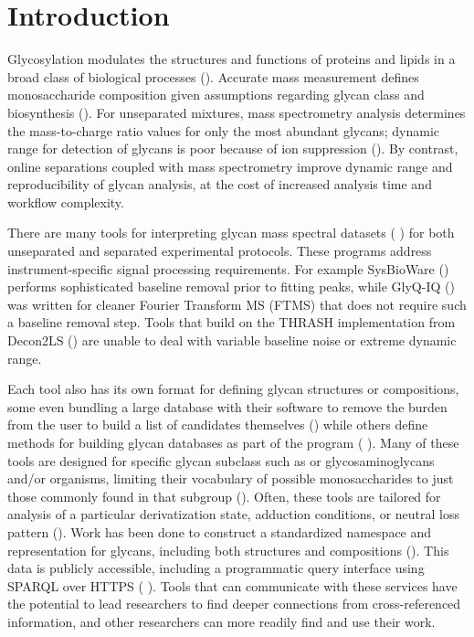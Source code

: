 \section{Introduction}

Glycosylation modulates the structures and functions of proteins and lipids
in a broad class of biological processes (\cite{Varki2017}). Accurate mass
measurement defines monosaccharide composition given assumptions regarding
glycan class and biosynthesis (\cite{Zaia2008}). For unseparated mixtures,
mass spectrometry analysis determines the mass-to-charge ratio values for
only the most abundant glycans; dynamic range for detection of glycans is
poor because of ion suppression (\cite{Peltoniemi2013}). By contrast, online
separations coupled with mass spectrometry improve dynamic range and
reproducibility of glycan analysis, at the cost of increased analysis time
and workflow complexity. 

There are many tools for interpreting glycan mass spectral datasets (
\cite{Yu2013,Peltoniemi2013,Kronewitter2014,Goldberg2009,Maxwell2012,Ceroni2008,Frank2010})
for both unseparated and separated experimental protocols. These programs address
instrument-specific signal processing requirements. For example SysBioWare
(\cite{Frank2010}) performs sophisticated baseline removal prior to fitting
peaks, while GlyQ-IQ (\cite{Kronewitter2014}) was written for cleaner Fourier Transform
MS (FTMS) that does not require such a baseline removal step. Tools that build on
the THRASH implementation from Decon2LS (\cite{Jaitly2009,Yu2013,Maxwell2012})
are unable to deal with variable baseline noise or extreme dynamic range.

Each tool also has its own format for defining glycan structures or compositions,
some even bundling a large database with their software to remove the burden from
the user to build a list of candidates themselves (\cite{Yu2013,Kronewitter2014,Goldberg2009})
while others define methods for building glycan databases as part of the program (
\cite{Maxwell2012,Ceroni2008}). Many of these tools are designed for specific glycan
subclass such as \nglycans or glycosaminoglycans and/or organisms, limiting their
vocabulary of possible monosaccharides to just those commonly found in that subgroup
(\cite{Yu2013,Kronewitter2014,Peltoniemi2013,Goldberg2009}). Often, these tools are
tailored for analysis of a particular derivatization state, adduction conditions, or
neutral loss pattern (\cite{Yu2013,Peltoniemi2013,Maxwell2012}). Work has been done
to construct a standardized namespace and representation for glycans, including both
structures and compositions (\cite{Tiemeyer2017,Campbell2014}). This data is publicly
accessible, including a programmatic query interface using SPARQL over HTTPS (
\cite{Aoki-Kinoshita2015}). Tools that can communicate with these services have the
potential to lead researchers to find deeper connections from cross-referenced information,
and other researchers can more readily find and use their work.


